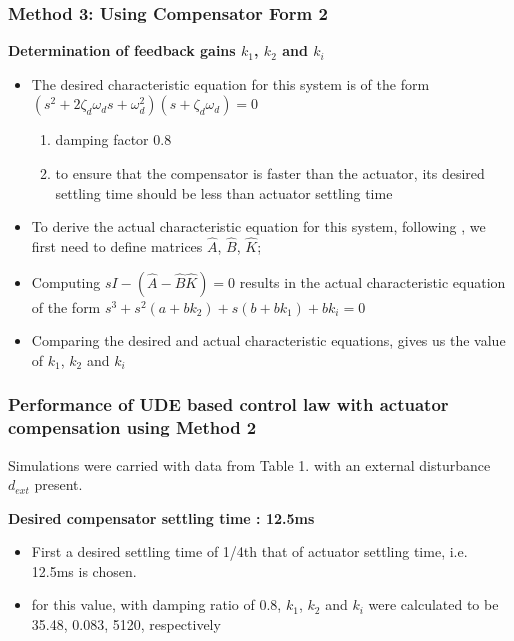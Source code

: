 \documentclass[table,10pt,red]{beamer}	%
\begin{document}
\begin{frame}
\frametitle{Method 3: Using Compensator Form 2}
\textbf{Determination of feedback gains $k_1$, $k_2$ and $k_i$}

\begin{itemize}
\item The desired characteristic equation for this system is of the form $(s^2+ 2\zeta_d\omega_ds+ \omega_d^2)(s+ \zeta_d\omega_d)=0$
\begin{enumerate}
\item damping factor 0.8
\item to ensure that the compensator is faster than the actuator, its desired settling time should be less than actuator settling time
\end{enumerate}
\item To derive the actual characteristic equation for this system, following \cite{ogata2010}, we first need to define matrices $\hat A$, $\hat B$, $\hat K$;
\item Computing $sI-(\hat A-\hat B\hat K)=0$ results in the actual characteristic equation of the form $s^3+s^2(a+bk_2)+s(b+bk_1)+bk_i=0$
\item Comparing the desired and actual characteristic equations, gives us the value of $k_1$, $k_2$ and $k_i$
\end{itemize}
\end{frame}
\begin{frame}
\frametitle{Performance of UDE based control law with actuator compensation using Method 2}
Simulations were carried with data from Table 1. with an external disturbance $d_{ext}$ present.

\textbf{Desired compensator settling time : 12.5ms}
\begin{itemize}
\item First a desired settling time of 1/4th that of actuator settling time, i.e. 12.5ms is chosen. 
		\item for this value, with damping ratio of 0.8, $k_1$, $k_2$ and $k_i$ were calculated to be 35.48, 0.083, 5120, respectively
\end{itemize}
\end{frame}
\end{document}
